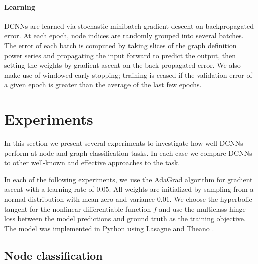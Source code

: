 \documentclass{article}
\begin{document}
\paragraph{Learning}
DCNNs are learned via stochastic minibatch gradient descent on backpropagated error.  At each epoch, node indices are randomly grouped into several batches.  The error of each batch is computed by taking slices of the graph definition power series and propagating the input forward to predict the output, then setting the weights by gradient ascent on the back-propagated error.  We also make use of windowed early stopping; training is ceased if the validation error of a given epoch is greater than the average of the last few epochs.

\section{Experiments}
\label{sec:experiments}
In this section we present several experiments to investigate how well DCNNs perform at node and graph classification tasks.  In each case we compare DCNNs to other well-known and effective approaches to the task.

In each of the following experiments, we use the AdaGrad algorithm \cite{duchi2011adaptive} for gradient ascent with a learning rate of $0.05$.  All weights are initialized by sampling from a normal distribution with mean zero and variance $0.01$.  We choose the hyperbolic tangent for the nonlinear differentiable function $f$ and use the multiclass hinge loss between the model predictions and ground truth as the training objective.  The model was implemented in Python using Lasagne and Theano \cite{bergstra+al:2010-scipy}.

\subsection{Node classification}
\end{document}
